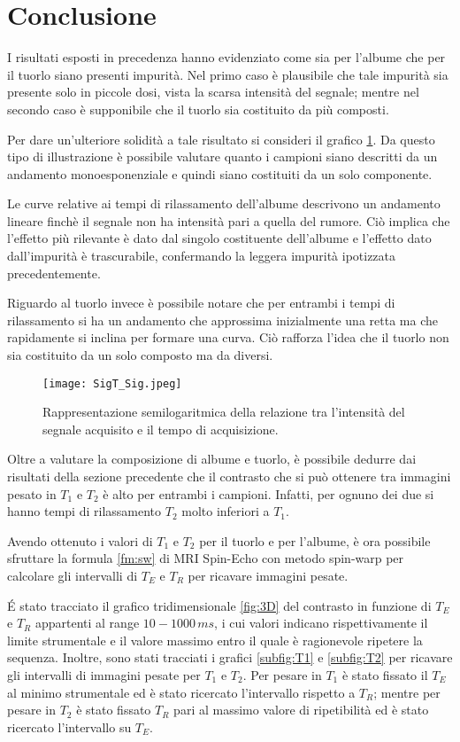 \section*{Conclusione}
I risultati esposti in precedenza hanno evidenziato come sia per l'albume che per il tuorlo siano presenti impurità.
Nel primo caso è plausibile che tale impurità sia presente solo in piccole dosi, vista la scarsa intensità del segnale; mentre nel secondo caso è supponibile che il tuorlo sia costituito da più composti.

Per dare un'ulteriore solidità a tale risultato si consideri il grafico \ref{fig:SigT_Sig}. 
Da questo tipo di illustrazione è possibile valutare quanto i campioni siano descritti da un andamento monoesponenziale e quindi siano costituiti da un solo componente.

Le curve relative ai tempi di rilassamento dell'albume descrivono un andamento lineare finchè il segnale non ha intensità pari a quella del rumore. 
Ciò implica che l'effetto più rilevante è dato dal singolo costituente dell'albume e l'effetto dato dall'impurità è trascurabile, confermando la leggera impurità ipotizzata precedentemente.

Riguardo al tuorlo invece è possibile notare che per entrambi i tempi di rilassamento si ha un andamento che approssima inizialmente una retta ma che rapidamente si inclina per formare una curva.
Ciò rafforza l'idea che il tuorlo non sia costituito da un solo composto ma da diversi.

\begin{figure}[ht]
\centering
\texttt{[image: SigT\_Sig.jpeg]}
\caption{Rappresentazione semilogaritmica della relazione tra l'intensità del segnale acquisito e il tempo di acquisizione.}
\label{fig:SigT_Sig}
\end{figure}


Oltre a valutare la composizione di albume e tuorlo, è possibile dedurre dai risultati della sezione precedente che il contrasto che si può ottenere tra immagini pesato in $T_1$ e $T_2$ è alto per entrambi i campioni.
Infatti, per ognuno dei due si hanno tempi di rilassamento $T_2$ molto inferiori a $T_1$.

Avendo ottenuto i valori di $T_1$ e $T_2$ per il tuorlo e per l'albume, è ora possibile sfruttare la formula \ref{fm:sw} di MRI Spin-Echo con metodo spin-warp per calcolare gli intervalli di $T_E$ e $T_R$ per ricavare immagini pesate.

\'E stato tracciato il grafico tridimensionale \ref{fig:3D} del contrasto in funzione di $T_E$ e $T_R$ appartenti al range $10-1000\,ms$, i cui valori indicano rispettivamente il limite strumentale e il valore massimo entro il quale è ragionevole ripetere la sequenza. 
Inoltre, sono stati tracciati i grafici \ref{subfig:T1} e \ref{subfig:T2} per ricavare gli intervalli di immagini pesate per $T_1$ e $T_2$.
Per pesare in $T_1$ è stato fissato il $T_E$ al minimo strumentale ed è stato ricercato l'intervallo rispetto a $T_R$; mentre per pesare in $T_2$ è stato fissato $T_R$ pari al massimo valore di ripetibilità ed è stato ricercato l'intervallo su $T_E$.

